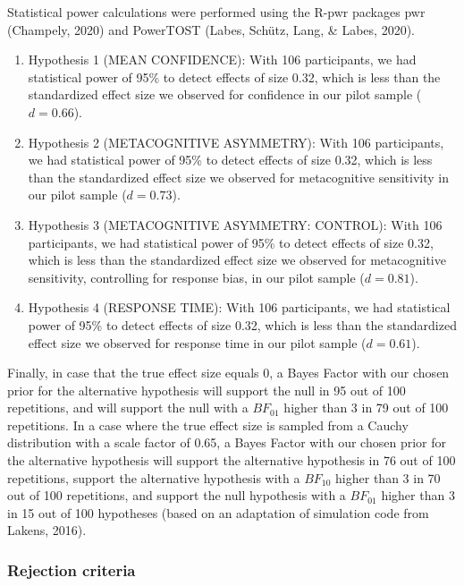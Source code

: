 \documentclass[12pt,twoside]{reedthesis}
\begin{document}
Statistical power calculations were performed using the R-pwr packages pwr (Champely, 2020) and PowerTOST (Labes, Schütz, Lang, \& Labes, 2020).
\begin{enumerate}
\def\labelenumi{\arabic{enumi}.}
\item
  Hypothesis 1 (MEAN CONFIDENCE): With 106 participants, we had statistical power of 95\% to detect effects of size 0.32, which is less than the standardized effect size we observed for confidence in our pilot sample (\(d=0.66\)).
\item
  Hypothesis 2 (METACOGNITIVE ASYMMETRY): With 106 participants, we had statistical power of 95\% to detect effects of size 0.32, which is less than the standardized effect size we observed for metacognitive sensitivity in our pilot sample (\(d=0.73\)).
\item
  Hypothesis 3 (METACOGNITIVE ASYMMETRY: CONTROL): With 106 participants, we had statistical power of 95\% to detect effects of size 0.32, which is less than the standardized effect size we observed for metacognitive sensitivity, controlling for response bias, in our pilot sample (\(d=0.81\)).
\item
  Hypothesis 4 (RESPONSE TIME): With 106 participants, we had statistical power of 95\% to detect effects of size 0.32, which is less than the standardized effect size we observed for response time in our pilot sample (\(d=0.61\)).
\end{enumerate}
Finally, in case that the true effect size equals 0, a Bayes Factor with our chosen prior for the alternative hypothesis will support the null in 95 out of 100 repetitions, and will support the null with a \(BF_{01}\) higher than 3 in 79 out of 100 repetitions. In a case where the true effect size is sampled from a Cauchy distribution with a scale factor of 0.65, a Bayes Factor with our chosen prior for the alternative hypothesis will support the alternative hypothesis in 76 out of 100 repetitions, support the alternative hypothesis with a \(BF_{10}\) higher than 3 in 70 out of 100 repetitions, and support the null hypothesis with a \(BF_{01}\) higher than 3 in 15 out of 100 hypotheses (based on an adaptation of simulation code from Lakens, 2016).

\hypertarget{rejection-criteria-1}{%
\subsubsection*{Rejection criteria}\label{rejection-criteria-1}}
\end{document}
